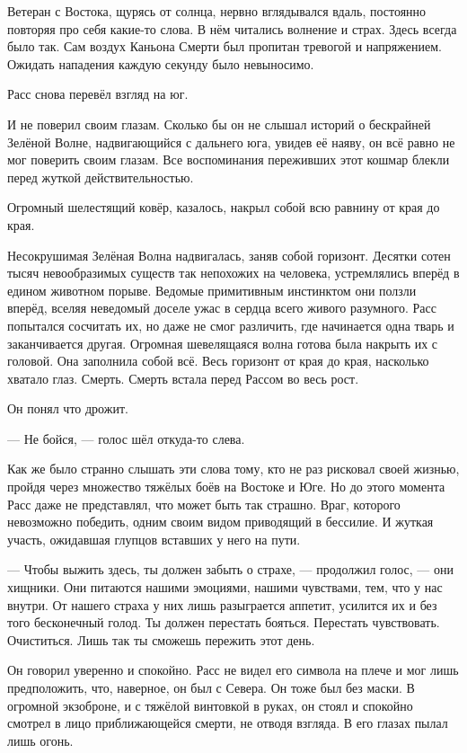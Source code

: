 Ветеран с Востока, щурясь от солнца, нервно вглядывался вдаль, постоянно 
повторяя про себя какие-то слова. В нём читались волнение и страх. Здесь всегда 
было так. Сам воздух Каньона Смерти был пропитан тревогой и напряжением. Ожидать 
нападения каждую секунду было невыносимо.

Расс снова перевёл взгляд на юг.

И не поверил своим глазам. Сколько бы он не слышал историй о бескрайней Зелёной 
Волне, надвигающийся с дальнего юга, увидев её наяву, он всё равно не мог 
поверить своим глазам. Все воспоминания переживших этот кошмар блекли перед 
жуткой действительностью.

Огромный шелестящий ковёр, казалось, накрыл собой всю равнину от края до края.

Несокрушимая Зелёная Волна надвигалась, заняв собой горизонт. Десятки сотен 
тысяч невообразимых существ так непохожих на человека, устремлялись вперёд в 
едином животном порыве. Ведомые примитивным инстинктом они ползли вперёд, вселяя 
неведомый доселе ужас в сердца всего живого разумного. Расс попытался сосчитать 
их, но даже не смог различить, где начинается одна тварь и заканчивается другая. 
Огромная шевелящаяся волна готова была накрыть их с головой. Она заполнила собой 
всё. Весь горизонт от края до края, насколько хватало глаз. Смерть. Смерть 
встала перед Рассом во весь рост.

Он понял что дрожит.

\noindent --- Не бойся, --- голос шёл откуда-то слева.

Как же было странно слышать эти слова тому, кто не раз рисковал своей жизнью, 
пройдя через множество тяжёлых боёв на Востоке и Юге. Но до этого момента Расс 
даже не представлял, что может быть так страшно. Враг, которого невозможно 
победить, одним своим видом приводящий в бессилие. И жуткая участь, ожидавшая 
глупцов вставших у него на пути.

\noindent --- Чтобы выжить здесь, ты должен забыть о страхе, --- продолжил 
голос, --- они хищники. Они питаются нашими эмоциями, нашими чувствами, тем, 
что у нас внутри. От нашего страха у них лишь разыграется аппетит, усилится их 
и без того бесконечный голод. Ты должен перестать бояться. Перестать 
чувствовать. Очиститься. Лишь так ты сможешь пережить этот день.

Он говорил уверенно и спокойно. Расс не видел его символа на плече и мог лишь предположить, что, наверное, он был с Севера. Он тоже был без маски. В огромной экзоброне, и с тяжёлой винтовкой в руках, он стоял и спокойно смотрел в лицо приближающейся смерти, не отводя взгляда. В его глазах пылал лишь огонь.

